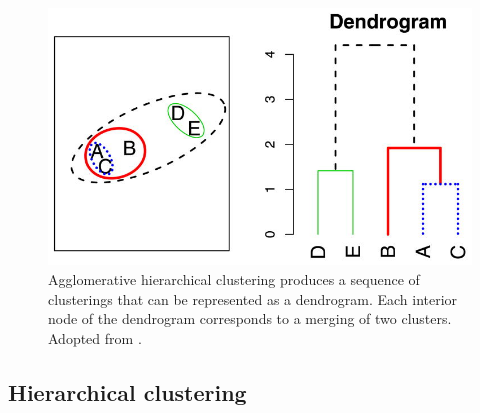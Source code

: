 \begin{figure}
	\includegraphics{clustering_linkage.jpg}
	\caption{
		Agglomerative hierarchical clustering produces a sequence of
		clusterings that can be represented as a dendrogram. Each
		interior node of the dendrogram corresponds to a merging of two
		clusters. Adopted from \citep{bien2011hierarchical}.
	}

	\label{fig:clustering}
\end{figure}

\subsection{Hierarchical clustering}
\label{sec:hierarhical_clustering}

